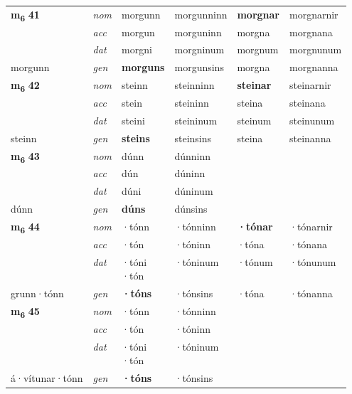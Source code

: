 \begin{longtable}[l]{X>{\footnotesize\itshape}XXXXX}
\multirow{3}{*}{{{\textbf{m{\textsubscript{6}}} \Large{\textbf{41}}}}} & nom & morgunn & morgunninn & \textbf{morgnar} & morgnarnir \\*
 & acc & morgun & morguninn & morgna & morgnana \\*
 & dat & morgni & morgninum & morgnum & morgnunum \\*
 {\footnotesize{morgunn}} & gen & \textbf{morguns} & morgunsins & morgna & morgnanna \\
\midrule

\multirow{3}{*}{{{\textbf{m{\textsubscript{6}}} \Large{\textbf{42}}}}} & nom & steinn & steinninn & \textbf{steinar} & steinarnir \\*
 & acc & stein & steininn & steina & steinana \\*
 & dat & steini & steininum & steinum & steinunum \\*
 {\footnotesize{steinn}} & gen & \textbf{steins} & steinsins & steina & steinanna \\
\midrule

\multirow{3}{*}{{{\textbf{m{\textsubscript{6}}} \Large{\textbf{43}}}}} & nom & dúnn & dúnninn & \textbf{} &  \\*
 & acc & dún & dúninn &  &  \\*
 & dat & dúni & dúninum &  &  \\*
 {\footnotesize{dúnn}} & gen & \textbf{dúns} & dúnsins &  &  \\
\midrule

\multirow{3}{*}{{{\textbf{m{\textsubscript{6}}} \Large{\textbf{44}}}}} & nom & ·tónn & ·tónninn & \textbf{·tónar} & ·tónarnir \\*
 & acc & ·tón & ·tóninn & ·tóna & ·tónana \\*
 & dat & \specialcell{·tóni\\  ·tón} & ·tóninum & ·tónum & ·tónunum \\*
 {\footnotesize{grunn\allowbreak ·tónn}} & gen & \textbf{·tóns} & ·tónsins & ·tóna & ·tónanna \\
\midrule

\multirow{3}{*}{{{\textbf{m{\textsubscript{6}}} \Large{\textbf{45}}}}} & nom & ·tónn & ·tónninn & \textbf{} &  \\*
 & acc & ·tón & ·tóninn &  &  \\*
 & dat & \specialcell{·tóni\\  ·tón} & ·tóninum &  &  \\*
 {\footnotesize{á\allowbreak ·vítunar\allowbreak ·tónn}} & gen & \textbf{·tóns} & ·tónsins &  &  \\
\midrule


\end{longtable}
